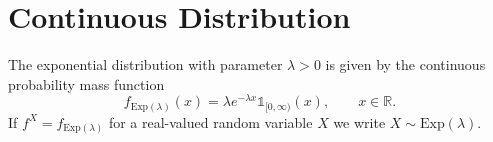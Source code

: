 \section{Continuous Distribution}

\begin{definition}
    The exponential distribution with parameter \(\lambda > 0\) is given by the continuous probability mass function
    \begin{equation}
        f_{\text{Exp}(\lambda)}(x) = \lambda e^{-\lambda x} \mathds{1}_{[0, \infty)}(x), \qquad x \in \mathbb{R} \text{.}
    \end{equation}
    If \(f^X = f_{\text{Exp}(\lambda)}\) for a real-valued random variable \(X\) we write \(X \sim \text{Exp}(\lambda)\).
\end{definition}